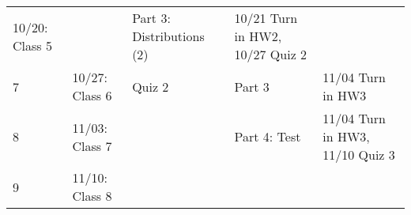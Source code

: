 \documentclass[
]{book}
\begin{document}
\begin{longtable}[]{@{}lllll@{}}
\begin{minipage}[t]{0.17\columnwidth}
10/20: Class 5\strut
\end{minipage} & \begin{minipage}[t]{0.08\columnwidth}\raggedright
\strut
\end{minipage} & \begin{minipage}[t]{0.32\columnwidth}\raggedright
Part 3: Distributions (2)\strut
\end{minipage} & \begin{minipage}[t]{0.22\columnwidth}\raggedright
10/21 Turn in HW2, 10/27 Quiz 2\strut
\end{minipage}\tabularnewline
\begin{minipage}[t]{0.08\columnwidth}\raggedright
7\strut
\end{minipage} & \begin{minipage}[t]{0.17\columnwidth}\raggedright
10/27: Class 6\strut
\end{minipage} & \begin{minipage}[t]{0.08\columnwidth}\raggedright
Quiz 2\strut
\end{minipage} & \begin{minipage}[t]{0.32\columnwidth}\raggedright
Part 3\strut
\end{minipage} & \begin{minipage}[t]{0.22\columnwidth}\raggedright
11/04 Turn in HW3\strut
\end{minipage}\tabularnewline
\begin{minipage}[t]{0.08\columnwidth}\raggedright
8\strut
\end{minipage} & \begin{minipage}[t]{0.17\columnwidth}\raggedright
11/03: Class 7\strut
\end{minipage} & \begin{minipage}[t]{0.08\columnwidth}\raggedright
\strut
\end{minipage} & \begin{minipage}[t]{0.32\columnwidth}\raggedright
Part 4: Test\strut
\end{minipage} & \begin{minipage}[t]{0.22\columnwidth}\raggedright
11/04 Turn in HW3, 11/10 Quiz 3\strut
\end{minipage}\tabularnewline
\begin{minipage}[t]{0.08\columnwidth}\raggedright
9\strut
\end{minipage} & \begin{minipage}[t]{0.17\columnwidth}\raggedright
11/10: Class 8\strut
\end{minipage} & \begin{minipage}[t]{0.08\columnwidth}\raggedright

\end{minipage}
\end{longtable}
\end{document}
